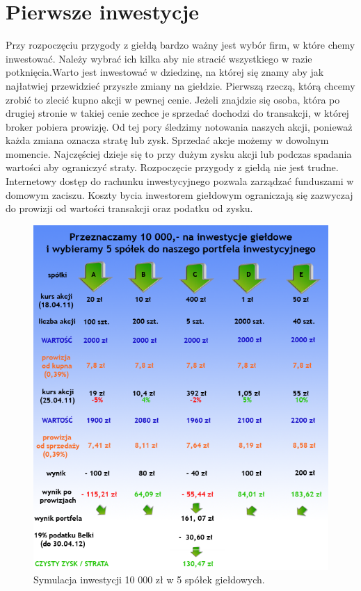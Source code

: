 \documentclass{report}
\begin{document}
\section{Pierwsze inwestycje}
Przy rozpoczęciu przygody z giełdą bardzo ważny jest wybór firm, w które chemy inwestować. Należy wybrać ich kilka aby nie stracić wszystkiego w razie potknięcia.Warto jest inwestować w dziedzinę, na której się znamy aby jak najłatwiej przewidzieć przyszłe zmiany na giełdzie. Pierwszą rzeczą, którą chcemy zrobić to zlecić kupno akcji w pewnej cenie. Jeżeli znajdzie się osoba, która po drugiej stronie w takiej cenie zechce je sprzedać dochodzi do transakcji, w której broker pobiera prowizję.
Od tej pory śledzimy notowania naszych akcji, ponieważ każda zmiana oznacza stratę lub zysk. Sprzedać akcje możemy w dowolnym momencie. Najczęściej dzieje się to przy dużym zysku akcji lub podczas spadania wartości aby ograniczyć straty. Rozpoczęcie przygody z giełdą nie jest trudne. Internetowy dostęp do rachunku inwestycyjnego pozwala  zarządzać funduszami w domowym zaciszu. Koszty bycia inwestorem giełdowym ograniczają się zazwyczaj do prowizji od wartości transakcji oraz podatku od zysku.
\begin{figure}[h]
\centering
\includegraphics[scale=0.6]{tabela}
\caption{Symulacja inwestycji 10 000 zł w 5 spółek giełdowych.\cite{sym11}}
\end{figure}
\newpage
\end{document}

